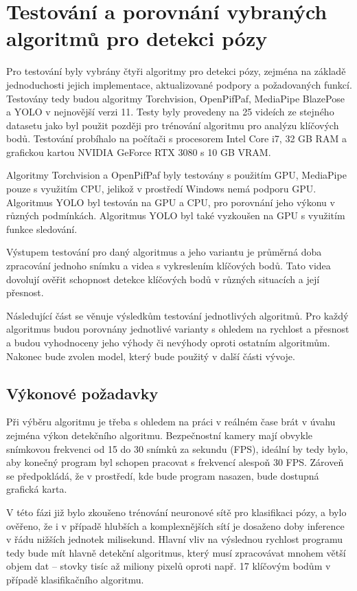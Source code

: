 \section{Testování a porovnání vybraných algoritmů pro detekci pózy}

Pro testování byly vybrány čtyři algoritmy pro detekci pózy, zejména na základě
jednoduchosti jejich implementace, aktualizované podpory a požadovaných funkcí.
Testovány tedy budou algoritmy Torchvision, OpenPifPaf, MediaPipe BlazePose a
YOLO v nejnovější verzi 11. Testy byly provedeny na 25 videích ze stejného
datasetu jako byl použit později pro trénování algoritmu pro analýzu klíčových
bodů. Testování probíhalo na počítači s procesorem Intel Core i7, 32 GB RAM a
grafickou kartou NVIDIA GeForce RTX 3080 s 10 GB VRAM.

Algoritmy Torchvision a OpenPifPaf byly testovány s použitím GPU, MediaPipe
pouze s využitím CPU, jelikož v prostředí Windows nemá podporu GPU. Algoritmus
YOLO byl testován na GPU a CPU, pro porovnání jeho výkonu v různých podmínkách.
Algoritmus YOLO byl také vyzkoušen na GPU s využitím funkce sledování.

Výstupem testování pro daný algoritmus a jeho variantu je průměrná doba
zpracování jednoho snímku a videa s vykreslením klíčových bodů. Tato videa
dovolují ověřit schopnost detekce klíčových bodů v různých situacích a její
přesnost.

Následující část se věnuje výsledkům testování jednotlivých algoritmů. Pro
každý algoritmus budou porovnány jednotlivé varianty s ohledem na rychlost a
přesnost a budou vyhodnoceny jeho výhody či nevýhody oproti ostatním
algoritmům. Nakonec bude zvolen model, který bude použitý v další části vývoje.

\subsection{Výkonové požadavky}
\label{sec:performance_requirements}

Při výběru algoritmu je třeba s ohledem na práci v reálném čase brát v úvahu
zejména výkon detekčního algoritmu. Bezpečnostní kamery mají obvykle snímkovou
frekvenci od 15 do 30 snímků za sekundu (FPS), ideální by tedy bylo, aby
konečný program byl schopen pracovat s frekvencí alespoň 30 FPS. Zároveň se
předpokládá, že v prostředí, kde bude program nasazen, bude dostupná grafická
karta.

V této fázi již bylo zkoušeno trénování neuronové sítě pro klasifikaci pózy, a
bylo ověřeno, že i v případě hlubších a komplexnějších sítí je dosaženo doby
inference v řádu nižších jednotek milisekund. Hlavní vliv na výslednou rychlost
programu tedy bude mít hlavně detekční algoritmus, který musí zpracovávat
mnohem větší objem dat – stovky tisíc až miliony pixelů oproti např. 17
klíčovým bodům v případě klasifikačního algoritmu.

